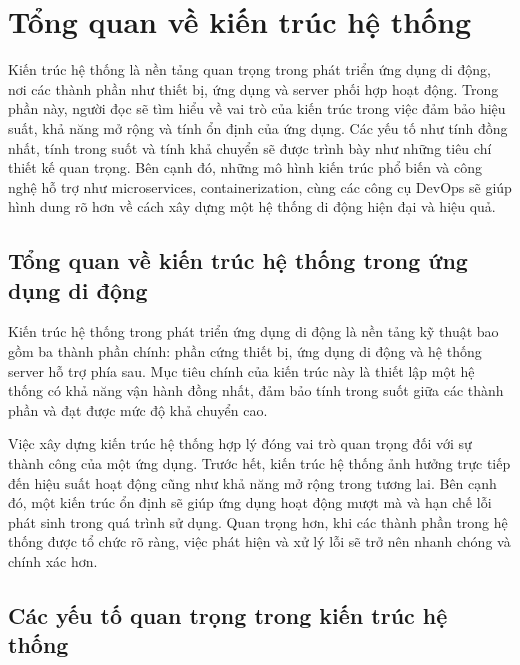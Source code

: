 
\section{Tổng quan về kiến trúc hệ thống}

    \hspace*{0.8cm}Kiến trúc hệ thống là nền tảng quan trọng trong phát triển ứng dụng di động, nơi các thành phần như thiết bị, ứng dụng và server phối hợp hoạt động. Trong phần này, người đọc sẽ tìm hiểu về vai trò của kiến trúc trong việc đảm bảo hiệu suất, khả năng mở rộng và tính ổn định của ứng dụng. Các yếu tố như tính đồng nhất, tính trong suốt và tính khả chuyển sẽ được trình bày như những tiêu chí thiết kế quan trọng. Bên cạnh đó, những mô hình kiến trúc phổ biến và công nghệ hỗ trợ như microservices, containerization, cùng các công cụ DevOps sẽ giúp hình dung rõ hơn về cách xây dựng một hệ thống di động hiện đại và hiệu quả.

    \subsection{Tổng quan về kiến trúc hệ thống trong ứng dụng di động}
    \renewcommand{\labelitemi}{--}    
    
    \hspace*{0.8cm}Kiến trúc hệ thống trong phát triển ứng dụng di động là nền tảng kỹ thuật bao gồm ba thành phần chính: phần cứng thiết bị, ứng dụng di động và hệ thống server hỗ trợ phía sau. Mục tiêu chính của kiến trúc này là thiết lập một hệ thống có khả năng vận hành đồng nhất, đảm bảo tính trong suốt giữa các thành phần và đạt được mức độ khả chuyển cao.
    
    \vspace{0.5em}
  
    \hspace*{0.8cm}Việc xây dựng kiến trúc hệ thống hợp lý đóng vai trò quan trọng đối với sự thành công của một ứng dụng. Trước hết, kiến trúc hệ thống ảnh hưởng trực tiếp đến hiệu suất hoạt động cũng như khả năng mở rộng trong tương lai. Bên cạnh đó, một kiến trúc ổn định sẽ giúp ứng dụng hoạt động mượt mà và hạn chế lỗi phát sinh trong quá trình sử dụng. Quan trọng hơn, khi các thành phần trong hệ thống được tổ chức rõ ràng, việc phát hiện và xử lý lỗi sẽ trở nên nhanh chóng và chính xác hơn.
    

    \subsection{Các yếu tố quan trọng trong kiến trúc hệ thống}
    \renewcommand{\labelitemi}{--}
    
